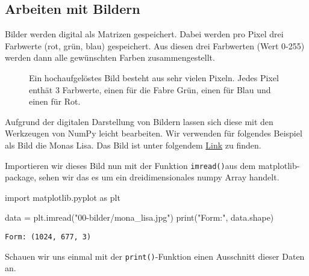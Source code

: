 \documentclass[
  letterpaper,
  DIV=11,
  numbers=noendperiod]{scrreprt}
\newenvironment{Shaded}{\begin{snugshade}}{\end{snugshade}}
\newcommand{\BuiltInTok}[1]{\textcolor[rgb]{0.00,0.23,0.31}{#1}}
\newcommand{\ImportTok}[1]{\textcolor[rgb]{0.00,0.46,0.62}{#1}}
\newcommand{\NormalTok}[1]{\textcolor[rgb]{0.00,0.23,0.31}{#1}}
\newcommand{\OperatorTok}[1]{\textcolor[rgb]{0.37,0.37,0.37}{#1}}
\newcommand{\StringTok}[1]{\textcolor[rgb]{0.13,0.47,0.30}{#1}}
\begin{document}
\begin{tcolorbox}
\chapter{Arbeiten mit Bildern}\label{arbeiten-mit-bildern}

Bilder werden digital als Matrizen gespeichert. Dabei werden pro Pixel
drei Farbwerte (rot, grün, blau) gespeichert. Aus diesen drei Farbwerten
(Wert 0-255) werden dann alle gewünschten Farben zusammengestellt.

\begin{figure}[H]


\caption{\label{fig-pixel_colors}Ein hochaufgelöstes Bild besteht aus
sehr vielen Pixeln. Jedes Pixel enthät 3 Farbwerte, einen für die Fabre
Grün, einen für Blau und einen für Rot.}

\end{figure}%

Aufgrund der digitalen Darstellung von Bildern lassen sich diese mit den
Werkzeugen von NumPy leicht bearbeiten. Wir verwenden für folgendes
Beispiel als Bild die Monas Lisa. Das Bild ist unter folgendem
\href{https://upload.wikimedia.org/wikipedia/commons/thumb/6/6a/Mona_Lisa.jpg/677px-Mona_Lisa.jpg}{Link}
zu finden.

Importieren wir dieses Bild nun mit der Funktion \texttt{imread()}aus
dem matplotlib-package, sehen wir das es um ein dreidimensionales numpy
Array handelt.

\begin{Shaded}
\begin{Highlighting}[]
\ImportTok{import}\NormalTok{ matplotlib.pyplot }\ImportTok{as}\NormalTok{ plt}

\NormalTok{data }\OperatorTok{=}\NormalTok{ plt.imread(}\StringTok{"00{-}bilder/mona\_lisa.jpg"}\NormalTok{)}
\BuiltInTok{print}\NormalTok{(}\StringTok{"Form:"}\NormalTok{, data.shape)}
\end{Highlighting}
\end{Shaded}

\begin{verbatim}
Form: (1024, 677, 3)
\end{verbatim}

Schauen wir uns einmal mit der \texttt{print()}-Funktion einen
Ausschnitt dieser Daten an.


\end{tcolorbox}
\end{document}
